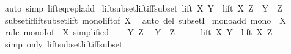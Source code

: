 \begin{isabellebody}
\isamarkupfalse%
\ {\isacharparenleft}{\kern0pt}auto\ simp{\isacharcolon}{\kern0pt}\ lift{\isacharunderscore}{\kern0pt}eq{\isacharunderscore}{\kern0pt}repl{\isacharunderscore}{\kern0pt}add{\isacharparenright}{\kern0pt}%
\endisatagproof
{\isafoldproof}%
%
\isadelimproof
\isanewline
%
\endisadelimproof
\isanewline
{}\isamarkupfalse%
\ lift{\isacharunderscore}{\kern0pt}subset{\isacharunderscore}{\kern0pt}lift{\isacharunderscore}{\kern0pt}iff{\isacharunderscore}{\kern0pt}subset{\isacharcolon}{\kern0pt}\ {\isachardoublequoteopen}lift\ X\ Y\ {\isasymsubseteq}\ lift\ X\ Z\ {\isasymlongleftrightarrow}\ Y\ {\isasymsubseteq}\ Z{\isachardoublequoteclose}\isanewline
%
\isadelimproof
\ \ %
\endisadelimproof
%
\isatagproof
{}\isamarkupfalse%
\ subset{\isacharunderscore}{\kern0pt}if{\isacharunderscore}{\kern0pt}lift{\isacharunderscore}{\kern0pt}subset{\isacharunderscore}{\kern0pt}lift\ mono{\isacharunderscore}{\kern0pt}lift{\isacharbrackleft}{\kern0pt}of\ X{\isacharbrackright}{\kern0pt}\ \isamarkupfalse%
\ {\isacharparenleft}{\kern0pt}auto\ del{\isacharcolon}{\kern0pt}\ subsetI{\isacharparenright}{\kern0pt}%
\endisatagproof
{\isafoldproof}%
%
\isadelimproof
\isanewline
%
\endisadelimproof
\isanewline
{}\isamarkupfalse%
\ mono{\isacharunderscore}{\kern0pt}add{\isacharcolon}{\kern0pt}\ {\isachardoublequoteopen}mono\ {\isacharparenleft}{\kern0pt}{\isacharparenleft}{\kern0pt}{\isacharplus}{\kern0pt}{\isacharparenright}{\kern0pt}\ X{\isacharparenright}{\kern0pt}{\isachardoublequoteclose}\isanewline
%
\isadelimproof
%
\endisadelimproof
%
\isatagproof
{}\isamarkupfalse%
\ {\isacharparenleft}{\kern0pt}rule\ monoI{\isacharbrackleft}{\kern0pt}of\ {\isachardoublequoteopen}{\isacharparenleft}{\kern0pt}{\isacharplus}{\kern0pt}{\isacharparenright}{\kern0pt}\ X{\isachardoublequoteclose}{\isacharcomma}{\kern0pt}\ simplified{\isacharbrackright}{\kern0pt}{\isacharparenright}{\kern0pt}\isanewline
\ \ \isamarkupfalse%
\ Y\ Z\ \isamarkupfalse%
\ {\isachardoublequoteopen}Y\ {\isasymsubseteq}\ Z{\isachardoublequoteclose}\isanewline
\ \ \isamarkupfalse%
\ \isamarkupfalse%
\ {\isachardoublequoteopen}lift\ X\ Y\ {\isasymsubseteq}\ lift\ X\ Z{\isachardoublequoteclose}\ \isamarkupfalse%
\ {\isacharparenleft}{\kern0pt}simp\ only{\isacharcolon}{\kern0pt}\ lift{\isacharunderscore}{\kern0pt}subset{\isacharunderscore}{\kern0pt}lift{\isacharunderscore}{\kern0pt}iff{\isacharunderscore}{\kern0pt}subset{\isacharparenright}{\kern0pt}\isanewline

\end{isabellebody}
